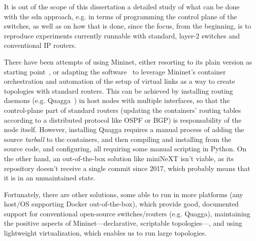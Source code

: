 It is out of the scope of this dissertation a detailed study of what can be done with the \gls{sdn} approach, e.g. in terms of programming the control plane of the switches, as well as on how that is done, since the focus, from the beginning, is to reproduce experiments currently runnable with standard, layer-2 switches and conventional IP routers.

There have been attempts of using Mininet, either resorting to its plain version as starting point~\cite{mininetquagga,mininetospfbgp}, or adapting the software~\cite{mininext} to leverage Mininet's container orchestration and automation of the setup of virtual links as a way to create topologies with standard routers.
This can be achieved by installing routing daemons (e.g. Quagga~\cite{quagga}) in host nodes with multiple interfaces, so that the control-plane part of standard routers (updating the containers' routing tables according to a distributed protocol like OSPF or BGP) is responsability of the node itself.
However, installing Quagga requires a manual process of adding the source \emph{tarball} to the containers, and then compiling and installing from the source code, and configuring, all requiring some manual scripting in Python.
On the other hand, an out-of-the-box solution like miniNeXT isn't viable, as its repository doesn't receive a single commit since 2017, which probably means that it is in an unmaintained state.

Fortunately, there are other solutions, some able to run in more platforms (any host/OS supporting Docker out-of-the-box), which provide good, documented support for conventional open-source switches/routers (e.g. Quagga), maintaining the positive aspects of Mininet---declarative, scriptable topologies---, and using lightweight virtualization, which enables us to run large topologies.

